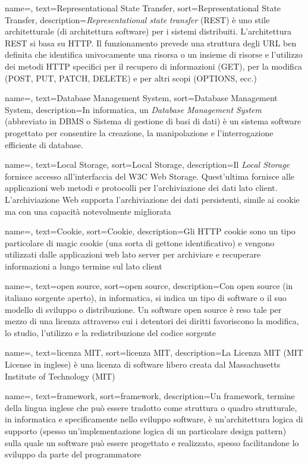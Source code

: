 {
    name=,
    text=Representational State Transfer,
    sort=Representational State Transfer,
    description={\emph{Representational state transfer} (REST) è uno stile architetturale (di architettura software) per i sistemi distribuiti. L'architettura REST si basa su HTTP. Il funzionamento prevede una struttura degli URL ben definita che identifica univocamente una risorsa o un insieme di risorse e l'utilizzo dei metodi HTTP specifici per il recupero di informazioni (GET), per la modifica (POST, PUT, PATCH, DELETE) e per altri scopi (OPTIONS, ecc.)}
}

{
    name=,
    text=Database Management System,
    sort=Database Management System,
    description={In informatica, un \emph{Database Management System} (abbreviato in DBMS o Sistema di gestione di basi di dati) è un sistema software progettato per consentire la creazione, la manipolazione e l'interrogazione efficiente di database.}
}

{
    name=,
    text=Local Storage,
    sort=Local Storage,
    description={Il \textit{Local Storage} fornisce accesso all'interfaccia del W3C Web Storage. Quest'ultima fornisce alle applicazioni web metodi e protocolli per l'archiviazione dei dati lato client. L'archiviazione Web supporta l'archiviazione dei dati persistenti, simile ai cookie ma con una capacità notevolmente migliorata}
}

{
    name=,
    text=Cookie,
    sort=Cookie,
    description={Gli HTTP cookie sono un tipo particolare di magic cookie (una sorta di gettone identificativo) e vengono utilizzati dalle applicazioni web lato server per archiviare e recuperare informazioni a lungo termine sul lato client}
}

{
    name=,
    text=open source,
    sort=open source,
    description={Con open source (in italiano sorgente aperto), in informatica, si indica un tipo di software o il suo modello di sviluppo o distribuzione. Un software open source è reso tale per mezzo di una licenza attraverso cui i detentori dei diritti favoriscono la modifica, lo studio, l'utilizzo e la redistribuzione del codice sorgente}
}

{
    name=,
    text=licenza MIT,
    sort=licenza MIT,
    description={La Licenza MIT (MIT License in inglese) è una licenza di software libero creata dal Massachusetts Institute of Technology (MIT)}
}

{
    name=,
    text=framework,
    sort=framework,
    description={Un framework, termine della lingua inglese che può essere tradotto come struttura o quadro strutturale, in informatica e specificamente nello sviluppo software, è un'architettura logica di supporto (spesso un'implementazione logica di un particolare design pattern) sulla quale un software può essere progettato e realizzato, spesso facilitandone lo sviluppo da parte del programmatore}
}
